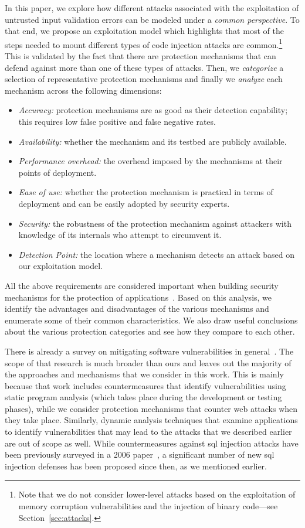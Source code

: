 \documentclass[conference]{IEEEtran}
\begin{document}
In this paper, we explore how different attacks associated with 
the exploitation of untrusted input validation errors can be modeled 
under a {\it common perspective}. To that end, we propose an exploitation
model which highlights that most of the steps needed to mount
different types of code injection attacks are
common.\footnote{Note that we do not consider lower-level attacks based on
the exploitation of memory corruption vulnerabilities and the injection
of binary code---see Section~\ref{sec:attacks}.} This is validated by the fact that
there are protection mechanisms that can defend against more than one of these
types of attacks. Then, we {\it categorize} a selection of representative
protection mechanisms and finally we {\it analyze} each mechanism across the
following dimensions:
\begin{itemize}
\item {\it Accuracy:} protection mechanisms are as good
  as their detection capability; this requires low false positive and
  false negative rates.
\item {\it Availability:} whether the mechanism and its
  testbed are publicly available.
\item {\it Performance overhead:} the 
  overhead imposed by the mechanisms at their points of deployment.
\item {\it Ease of use:} whether the protection
  mechanism is practical in terms of deployment
  and can be easily adopted by security experts.
\item {\it Security:} the robustness of the protection mechanism against
  attackers with knowledge of its internals who attempt to circumvent it.
\item {\it Detection Point:} the location where a mechanism detects an attack
  based on our exploitation model.
\end{itemize}

\noindent
All the above requirements are considered important
when building security mechanisms for the protection of
applications~\cite{A01,A00,SPWS13,nature2014}.
Based on this analysis, we identify the advantages
and disadvantages of the
various mechanisms and enumerate some of their common
characteristics. We also draw useful conclusions
about the various protection categories and see how they compare
to each other.

There is already a survey on mitigating software vulnerabilities in
general~\cite{SZ12}. The scope of that research is much broader than
ours and leaves out the majority of the approaches and mechanisms that
we consider in this work. This is mainly because that work includes
countermeasures that identify vulnerabilities using static program analysis
(which takes place during the development or testing phases), while we
consider protection mechanisms that counter web attacks when they take
place. Similarly, dynamic analysis techniques that examine
applications to identify vulnerabilities that may lead to the attacks
that we described earlier are out of scope as well. While
countermeasures against {\sc sql} injection attacks have been
previously surveyed in a 2006 paper~\cite{HVO06}, a significant number
of new {\sc sql} injection defenses has been proposed since then, as
we mentioned earlier.
\end{document}
